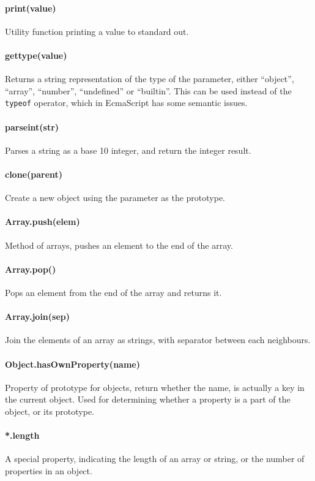 \documentclass[11pt]{report}
\begin{document}
\paragraph{print(value)} Utility function printing a value to standard out.
\paragraph{gettype(value)} Returns a string representation of the type of the parameter, either ``object'', ``array'', ``number'', ``undefined'' or ``builtin''. This can be used instead of the \verb|typeof| operator, which in EcmaScript has some semantic issues.
\paragraph{parseint(str)} Parses a string as a base 10 integer, and return the integer result.
\paragraph{clone(parent)} Create a new object using the parameter as the prototype.
\paragraph{Array.push(elem)} Method of arrays, pushes an element to the end of the array.
\paragraph{Array.pop()} Pops an element from the end of the array and returns it.
\paragraph{Array.join(sep)} Join the elements of an array as strings, with separator between each neighbours.
\paragraph{Object.hasOwnProperty(name)} Property of prototype for objects, return whether the name, is actually a key in the current object. Used for determining whether a property is a part of the object, or its prototype.
\paragraph{*.length} A special property, indicating the length of an array or string, or the number of properties in an object.
\end{document}
